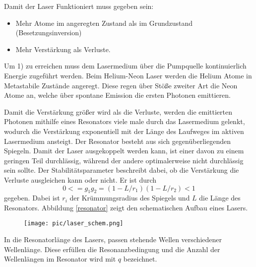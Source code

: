 Damit der Laser Funktioniert muss gegeben sein:
\begin{itemize}
	\item Mehr Atome im angeregten Zustand als im Grundzustand (Besetzungsinversion)
	\item Mehr Verstärkung als Verluste.
\end{itemize}

Um 1) zu erreichen muss dem Lasermedium über die Pumpquelle kontinuierlich Energie zugeführt werden.
Beim Helium-Neon Laser werden die Helium Atome in Metastabile Zustände angeregt.
Diese regen über Stöße zweiter Art die Neon Atome an, welche über spontane Emission die ersten Photonen emittieren.

Damit die Verstärkung größer wird als die Verluste, werden die emittierten Photonen mithilfe eines Resonators viele male durch das Lasermedium gelenkt, wodurch die Verstärkung exponentiell mit der Länge des Laufweges im aktiven Lasermedium ansteigt.
Der Resonator besteht aus sich gegenüberliegenden Spiegeln.
Damit der Laser ausgekoppelt werden kann, ist einer davon zu einem geringen Teil durchlässig, während der andere optimalerweise nicht durchlässig sein sollte.
Der Stabilitätsparameter beschreibt dabei, ob die Verstärkung die Verluste ausgleichen kann oder nicht. 
Er ist durch 
\begin{equation*}
	0 <= g_1 g_2 = (1-L/r_1)(1-L/r_2) < 1
\end{equation*}
gegeben.
Dabei ist $r_i$ der Krümmungsradius des Spiegels und $L$ die Länge des Resonators.
Abbildung \ref{resonator} zeigt den schematischen Aufbau eines Lasers.
\begin{figure}[h!]
	\texttt{[image: pic/laser\_schem.png]}
\end{figure}

In die Resonatorlänge des Lasers, passen stehende Wellen verschiedener Wellenlänge.
Diese erfüllen die Resonanzbedingung und die Anzahl der Wellenlängen im Resonator wird mit $q$ bezeichnet.